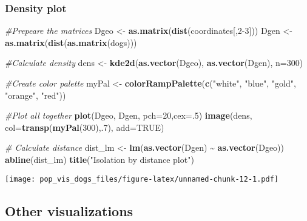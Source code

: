 \documentclass[
]{article}
\newenvironment{Shaded}{\begin{snugshade}}{\end{snugshade}}
\newcommand{\AttributeTok}[1]{\textcolor[rgb]{0.13,0.29,0.53}{#1}}
\newcommand{\CommentTok}[1]{\textcolor[rgb]{0.56,0.35,0.01}{\textit{#1}}}
\newcommand{\ConstantTok}[1]{\textcolor[rgb]{0.56,0.35,0.01}{#1}}
\newcommand{\DecValTok}[1]{\textcolor[rgb]{0.00,0.00,0.81}{#1}}
\newcommand{\FunctionTok}[1]{\textcolor[rgb]{0.13,0.29,0.53}{\textbf{#1}}}
\newcommand{\NormalTok}[1]{#1}
\newcommand{\OtherTok}[1]{\textcolor[rgb]{0.56,0.35,0.01}{#1}}
\newcommand{\SpecialCharTok}[1]{\textcolor[rgb]{0.81,0.36,0.00}{\textbf{#1}}}
\newcommand{\StringTok}[1]{\textcolor[rgb]{0.31,0.60,0.02}{#1}}
\begin{document}
\subsubsection{Density plot}\label{density-plot}

\begin{Shaded}
\begin{Highlighting}[]
\CommentTok{\#Prepeare the matrices}
\NormalTok{Dgeo }\OtherTok{\textless{}{-}} \FunctionTok{as.matrix}\NormalTok{(}\FunctionTok{dist}\NormalTok{(coordinates[,}\DecValTok{2{-}3}\NormalTok{]))}
\NormalTok{Dgen }\OtherTok{\textless{}{-}} \FunctionTok{as.matrix}\NormalTok{(}\FunctionTok{dist}\NormalTok{(}\FunctionTok{as.matrix}\NormalTok{(dogs)))}

\CommentTok{\#Calculate density}
\NormalTok{dens }\OtherTok{\textless{}{-}} \FunctionTok{kde2d}\NormalTok{(}\FunctionTok{as.vector}\NormalTok{(Dgeo), }\FunctionTok{as.vector}\NormalTok{(Dgen), }\AttributeTok{n=}\DecValTok{300}\NormalTok{)}

\CommentTok{\#Create color palette}
\NormalTok{myPal }\OtherTok{\textless{}{-}} \FunctionTok{colorRampPalette}\NormalTok{(}\FunctionTok{c}\NormalTok{(}\StringTok{"white"}\NormalTok{, }\StringTok{"blue"}\NormalTok{, }\StringTok{"gold"}\NormalTok{, }\StringTok{"orange"}\NormalTok{, }\StringTok{"red"}\NormalTok{))}

\CommentTok{\#Plot all together}
\FunctionTok{plot}\NormalTok{(Dgeo, Dgen, }\AttributeTok{pch=}\DecValTok{20}\NormalTok{,}\AttributeTok{cex=}\NormalTok{.}\DecValTok{5}\NormalTok{)}
\FunctionTok{image}\NormalTok{(dens, }\AttributeTok{col=}\FunctionTok{transp}\NormalTok{(}\FunctionTok{myPal}\NormalTok{(}\DecValTok{300}\NormalTok{),.}\DecValTok{7}\NormalTok{), }\AttributeTok{add=}\ConstantTok{TRUE}\NormalTok{)}

\CommentTok{\# Calculate distance }
\NormalTok{dist\_lm }\OtherTok{\textless{}{-}} \FunctionTok{lm}\NormalTok{(}\FunctionTok{as.vector}\NormalTok{(Dgen) }\SpecialCharTok{\textasciitilde{}} \FunctionTok{as.vector}\NormalTok{(Dgeo))}
\FunctionTok{abline}\NormalTok{(dist\_lm)}
\FunctionTok{title}\NormalTok{(}\StringTok{"Isolation by distance plot"}\NormalTok{)}
\end{Highlighting}
\end{Shaded}

\texttt{[image: pop\_vis\_dogs\_files/figure-latex/unnamed-chunk-12-1.pdf]}

\subsection{Other visualizations}\label{other-visualizations}
\end{document}
